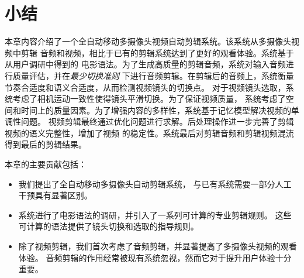 \section{小结}
本章内容介绍了一个全自动移动多摄像头视频自动剪辑系统。该系统从多摄像头视频中剪辑
音频和视频，相比于已有的剪辑系统达到了更好的观看体验。系统基于从用户调研中得到的
电影语法。为了生成高质量的剪辑音频，系统对输入音频进行质量评估，并在\emph{最少切换准则}
下进行音频剪辑。在剪辑后的音频上，系统衡量节奏合适度和语义合适度，从而检测视频镜头的切换点。
对于视频镜头选取，系统考虑了相机运动一致性使得镜头平滑切换。为了保证视频质量，
系统考虑了空间和时间上的质量因素。为了增强内容的多样性，系统基于记忆模型解决视频的单调性问题。
视频剪辑最终通过优化问题进行求解。后处理操作进一步完善了剪辑视频的语义完整性，增加了视频
的稳定性。系统最后对剪辑音频和剪辑视频混流得到最后的剪辑结果。

本章的主要贡献包括：
\begin{itemize}
    \item 我们提出了全自动移动多摄像头自动剪辑系统，
        与已有系统需要一部分人工干预具有显著区别。
    \item 系统进行了电影语法的调研，并引入了一系列可计算的专业剪辑规则。
        这些可计算的语法提供了镜头切换和选取的指导规则。
    \item 除了视频剪辑，我们首次考虑了音频剪辑，并显著提高了多摄像头视频的观看体验。
        音频剪辑的作用经常被现有系统忽视，然而它对于提升用户体验十分重要。
\end{itemize}
